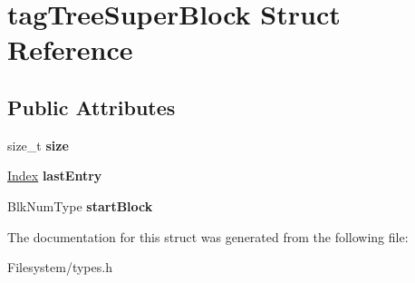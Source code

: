 \hypertarget{structtagTreeSuperBlock}{}\section{tag\+Tree\+Super\+Block Struct Reference}
\label{structtagTreeSuperBlock}
\subsection*{Public Attributes}
\begin{DoxyCompactItemize}
\item 
\mbox{\label{structtagTreeSuperBlock_a5fba4a1328640e6b41f4c3e8ca7ee804}} 
size\+\_\+t {\bfseries size}
\item 
\mbox{\label{structtagTreeSuperBlock_ac2492d025873ac0d95921ee91acabe51}} 
\mbox{\hyperlink{structindex}{Index}} {\bfseries last\+Entry}
\item 
\mbox{\label{structtagTreeSuperBlock_ad7f50abf9a6efeee63037e73d0c349d9}} 
Blk\+Num\+Type {\bfseries start\+Block}
\end{DoxyCompactItemize}


The documentation for this struct was generated from the following file\+:\begin{DoxyCompactItemize}
\item 
Filesystem/types.\+h\end{DoxyCompactItemize}
